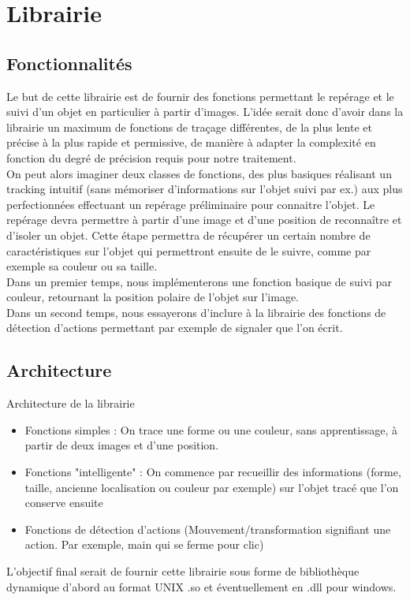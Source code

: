 \documentclass{article}
\begin{document}
	\section{Librairie}
		\subsection{Fonctionnalités}
			Le but de cette librairie est de fournir des fonctions permettant le repérage et le suivi d'un objet en particulier à partir d'images. 
			L'idée serait donc d'avoir dans la librairie un maximum de fonctions de traçage différentes, de la plus lente et précise à la plus rapide et permissive, de manière à adapter la complexité en fonction du degré de précision requis pour notre traitement. \\
			On peut alors imaginer deux classes de fonctions, des plus basiques réalisant un tracking intuitif (sans mémoriser d'informations sur l'objet suivi par ex.) aux plus perfectionnées effectuant un repérage préliminaire pour connaitre l'objet.
			Le repérage devra permettre à partir d'une image et d'une position de reconnaître et d'isoler un objet. Cette étape permettra de récupérer un certain nombre de caractéristiques sur l'objet qui permettront ensuite de le suivre, comme par exemple sa couleur ou sa taille. \\
Dans un premier temps, nous implémenterons une fonction basique de suivi par couleur, retournant la position polaire de l'objet sur l'image. \\
Dans un second temps, nous essayerons d'inclure à la librairie des fonctions de détection d'actions permettant par exemple de signaler que l'on écrit. 
		\subsection{Architecture}
			Architecture de la librairie 
			\begin{itemize}
				\item Fonctions simples : On trace une forme ou une couleur, sans apprentissage, à partir de deux images et d'une position.
				\item Fonctions "intelligente" : On commence par recueillir des informations (forme, taille, ancienne localisation ou couleur par exemple) sur l'objet tracé que l'on conserve ensuite    
				\item Fonctions de détection d'actions (Mouvement/transformation signifiant une action. Par exemple, main qui se ferme pour clic)
			\end{itemize}
			L'objectif final serait de fournir cette librairie sous forme de bibliothèque dynamique d'abord au format UNIX .so et éventuellement en .dll pour windows. 
\end{document}

